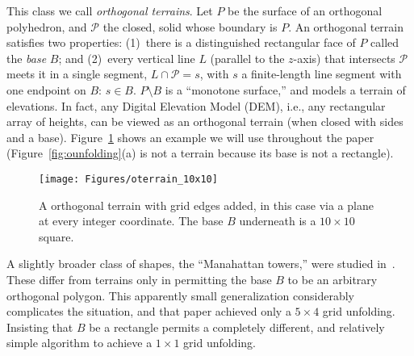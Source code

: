 \pdfoutput=1  \documentclass[]{article}
\newcommand{\figlab}[1]{\label{fig:#1}}
\newcommand{\figref}[1]{\ref{fig:#1}}
\def\P{{\mathcal P}}
\begin{document}
This class we call \emph{orthogonal terrains}.
Let $P$ be the surface of an orthogonal polyhedron, 
and $\P$ the closed,
solid whose boundary is $P$.
An orthogonal terrain satisfies
two properties:
(1)~there is a distinguished rectangular face of $P$ called the \emph{base} $B$;
and
(2)~every vertical line $L$ (parallel to the $z$-axis) that intersects $\P$
meets it in a single segment, $L \cap \P = s$, with $s$ a finite-length
line segment with one endpoint on $B$: $s \in B$.
$P \setminus B$ is a ``monotone surface,''
and models a terrain of elevations.
In fact, any Digital Elevation Model (DEM), i.e., any rectangular
array of heights, can be viewed as an orthogonal terrain (when closed with
sides and a base).
Figure~\figref{oterrain_10x10} shows an example we will use throughout
the paper (Figure~\figref{ounfolding}(a) is not a terrain because
its base is not a rectangle).
\begin{figure}[htbp]
\centering
\texttt{[image: Figures/oterrain\_10x10]}
\caption{A orthogonal terrain with grid edges added,
in this case via a plane at every integer coordinate.
The base $B$ underneath is a $10 {\times} 10$ square.}
\figlab{oterrain_10x10}
\end{figure}


A slightly broader class of shapes,
the ``Manahattan towers,''
were studied in~\cite{dfo-umt-05}.
These differ from terrains only in permitting the base $B$ to be an arbitrary orthogonal
polygon.
This apparently small generalization considerably complicates the situation,
and that paper achieved only a
$5 {\times} 4$ grid unfolding.
Insisting that $B$ be a rectangle permits a completely different, and
relatively simple algorithm
to achieve a $1 {\times} 1$ grid unfolding.
\end{document}
